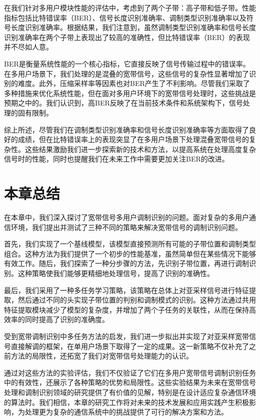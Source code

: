 在我们针对多用户模块性能的评估中，考虑到了两个子带：高子带和低子带。性能指标包括比特错误率（BER）、信号长度识别准确率、调制类型识别准确率以及符号长度识别准确率。根据结果，我们注意到，虽然调制类型识别准确率和信号长度识别准确率在两个子带上表现出了较高的准确性，但比特错误率（BER）的表现并不尽如人意。

BER是衡量系统性能的一个核心指标，它直接反映了信号传输过程中的错误率。在多用户场景下，我们处理的是混叠的宽带信号，这些信号的复杂性显著增加了识别的难度。此外，压缩采样率等因素也对BER产生了不利影响。尽管我们采取了多种措施来优化系统性能，但在面对多用户环境下的宽带信号处理时，这些挑战是预期之中的。我们认识到，高BER反映了在当前技术条件和系统架构下，信号处理的固有限制。

综上所述，尽管我们在调制类型识别准确率和信号长度识别准确率等方面取得了良好的成绩，但在比特错误率上的表现突显了在多用户场景下处理混叠宽带信号的复杂性。这些结果激励我们进一步探索新的技术和方法，以提高系统在处理高度复杂信号时的性能，同时也提醒我们在未来工作中需要更加关注BER的改进。


\section{本章总结}\label{sec:background}
在本章中，我们深入探讨了宽带信号多用户调制识别的问题。面对复杂的多用户通信环境，我们提出并测试了三种不同的策略来解决宽带信号的调制识别问题。

首先，我们实现了一个基线模型，该模型直接预测所有可能的子带位置和调制类型组合。这种方法为我们提供了一个初步的性能基准，虽然简单但在某些情况下能够有效工作。随后，我们探索了一种分步骤的方法，先识别子带位置，再进行调制识别。这种策略使我们能够更精细地处理信号，提高了识别的准确性。

最后，我们采用了一种多任务学习策略，该策略在总体上对亚采样信号进行特征提取，然后通过不同的头实现子带位置的判别和调制模式的识别。这种方法通过共用特征提取模块减少了模型的复杂度，并增加了两个子任务的关联性，从而在保持高效率的同时提高了识别的准确度。

受到宽带调制识别中多任务方法的启发，我们进一步拟出并实现了对亚采样宽带信号直接解调的框架，在单用户场景下取得了一定的成果。这一新策略不仅补充了之前方法的局限性，还拓宽了我们对宽带信号处理能力的认识。

通过对这些方法的实验评估，我们不仅验证了它们在多用户宽带信号调制识别任务中的有效性，还展示了各种策略的优势和局限性。这些实验结果为未来在宽带信号处理和调制识别领域的研究提供了有价值的见解，特别是在设计适应复杂通信环境的算法时。我们相信，本章的研究工作将对未来的技术发展和应用实践产生积极影响，为处理更为复杂的通信系统中的挑战提供了可行的解决方案和方法。
